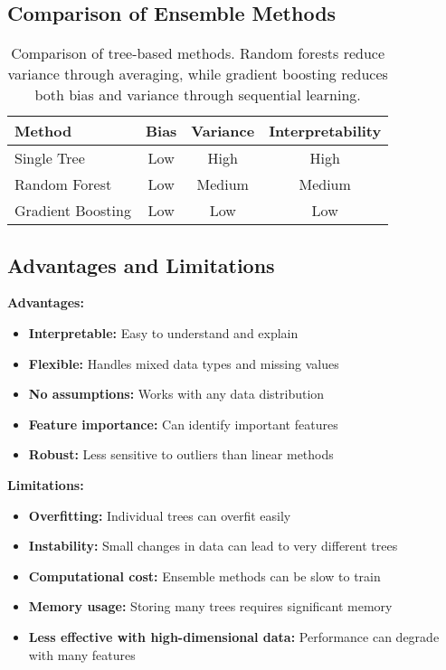 \subsection{Comparison of Ensemble Methods}

\begin{table}[htbp]
\centering
\begin{tabular}{lccc}
\toprule
Method & Bias & Variance & Interpretability \\
\midrule
Single Tree & Low & High & High \\
Random Forest & Low & Medium & Medium \\
Gradient Boosting & Low & Low & Low \\
\bottomrule
\end{tabular}
\caption{Comparison of tree-based methods. Random forests reduce variance through averaging, while gradient boosting reduces both bias and variance through sequential learning.}
\label{tab:ensemble-comparison}
\end{table}

\subsection{Advantages and Limitations}

\textbf{Advantages:}
\begin{itemize}
    \item \textbf{Interpretable:} Easy to understand and explain
    \item \textbf{Flexible:} Handles mixed data types and missing values
    \item \textbf{No assumptions:} Works with any data distribution
    \item \textbf{Feature importance:} Can identify important features
    \item \textbf{Robust:} Less sensitive to outliers than linear methods
\end{itemize}

\textbf{Limitations:}
\begin{itemize}
    \item \textbf{Overfitting:} Individual trees can overfit easily
    \item \textbf{Instability:} Small changes in data can lead to very different trees
    \item \textbf{Computational cost:} Ensemble methods can be slow to train
    \item \textbf{Memory usage:} Storing many trees requires significant memory
    \item \textbf{Less effective with high-dimensional data:} Performance can degrade with many features
\end{itemize}

